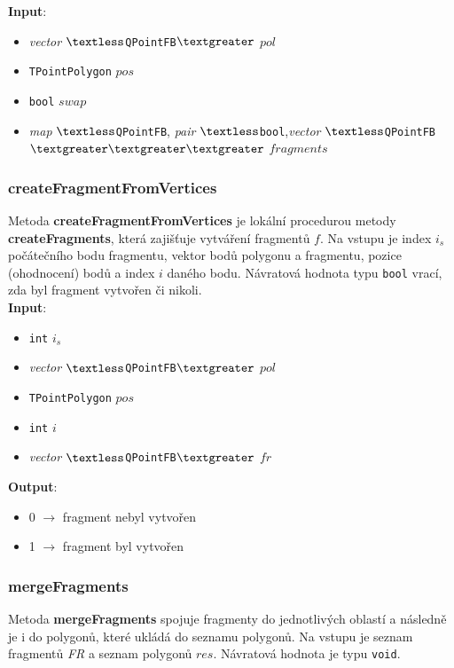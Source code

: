 \documentclass[a4paper, 12pt]{article}
\begin{document}
\textbf{Input}:
\begin{itemize}
\item \textsl{vector} $\textless$\texttt{QPointFB}$\textgreater$ $pol$
\item \texttt{TPointPolygon} $pos$
\item \texttt{bool} $swap$
\item \textsl{map} $\textless$\texttt{QPointFB}, \textsl{pair} $\textless$\texttt{bool},\textsl{vector} $\textless$\texttt{QPointFB}$\textgreater \textgreater \textgreater$ $fragments$
\end{itemize}

\subsubsection*{createFragmentFromVertices}
Metoda \textbf{createFragmentFromVertices} je lokální procedurou metody \textbf{createFragments}, která zajišťuje vytváření fragmentů $f$. Na vstupu je index $i_s$ počátečního bodu fragmentu, vektor bodů polygonu a fragmentu, pozice (ohodnocení) bodů a index $i$ daného bodu. Návratová hodnota typu \texttt{bool} vrací, zda byl fragment vytvořen či nikoli.\\ 

\textbf{Input}:
\begin{itemize}
\item \texttt{int} $i_s$ 
\item \textsl{vector} $\textless$\texttt{QPointFB}$\textgreater$ $pol$
\item \texttt{TPointPolygon} $pos$
\item \texttt{int} $i$ 
\item \textsl{vector} $\textless$\texttt{QPointFB}$\textgreater$ $fr$
\end{itemize}

\textbf{Output}:
\begin{itemize}
\item 0 $\rightarrow$ fragment nebyl vytvořen 
\item 1 $\rightarrow$ fragment byl vytvořen 
\end{itemize}

\subsubsection*{mergeFragments}
Metoda \textbf{mergeFragments} spojuje fragmenty do jednotlivých oblastí a následně je i do polygonů, které ukládá do seznamu polygonů.  Na vstupu je seznam fragmentů \textit{FR} a sez\-nam polygonů $res$. Návratová hodnota je typu \texttt{void}.\\ 
\end{document}
